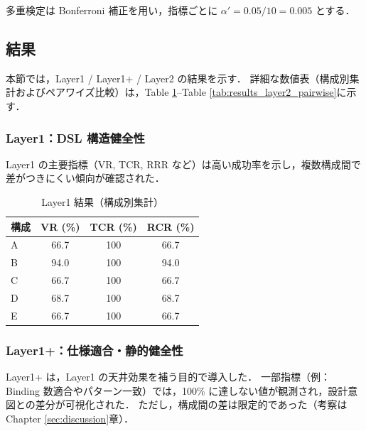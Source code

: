 \documentclass[a4paper,10pt]{jarticle}
\begin{document}
多重検定は Bonferroni 補正を用い，指標ごとに $\alpha' = 0.05/10 = 0.005$ とする．

\subsection{結果}
本節では，Layer1 / Layer1+ / Layer2 の結果を示す．
詳細な数値表（構成別集計およびペアワイズ比較）は，Table \ref{tab:results_layer1}--Table \ref{tab:results_layer2_pairwise}に示す．

\subsubsection{Layer1：DSL 構造健全性}
Layer1 の主要指標（VR, TCR, RRR など）は高い成功率を示し，複数構成間で差がつきにくい傾向が確認された．

\begin{table}[!t]
\centering
\caption{Layer1 結果（構成別集計）}
\label{tab:results_layer1}
\small
\begin{tabular}{lccc} \toprule
構成 & VR (\%) & TCR (\%) & RCR (\%) \\ \midrule
A & 66.7 & 100 & 66.7 \\
B & 94.0 & 100 & 94.0 \\
C & 66.7 & 100 & 66.7 \\
D & 68.7 & 100 & 68.7 \\
E & 66.7 & 100 & 66.7 \\
\bottomrule
\end{tabular}
\end{table}

\subsubsection{Layer1+：仕様適合・静的健全性}
Layer1+ は，Layer1 の天井効果を補う目的で導入した．
一部指標（例：Binding 数適合やパターン一致）では，100\% に達しない値が観測され，設計意図との差分が可視化された．
ただし，構成間の差は限定的であった（考察はChapter \ref{sec:discussion}章）．
\end{document}
